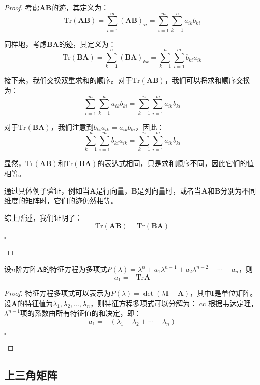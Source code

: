 \begin{proof}
	考虑$\mathbf{A}\mathbf{B}$的迹，其定义为：
$$
\text{Tr}(\mathbf{A}\mathbf{B}) = \sum_{i=1}^m (\mathbf{A}\mathbf{B})_{ii} = \sum_{i=1}^m \sum_{k=1}^n a_{ik} b_{ki}
$$

同样地，考虑$\mathbf{B}\mathbf{A}$的迹，其定义为：
$$
\text{Tr}(\mathbf{B}\mathbf{A}) = \sum_{k=1}^n (\mathbf{B}\mathbf{A})_{kk} = \sum_{k=1}^n \sum_{i=1}^m b_{ki} a_{ik}
$$

接下来，我们交换双重求和的顺序。对于$\text{Tr}(\mathbf{A}\mathbf{B})$，我们可以将求和顺序交换为：
$$
\sum_{i=1}^m \sum_{k=1}^n a_{ik} b_{ki} = \sum_{k=1}^n \sum_{i=1}^m a_{ik} b_{ki}
$$

对于$\text{Tr}(\mathbf{B}\mathbf{A})$，我们注意到$b_{ki} a_{ik} = a_{ik} b_{ki}$，因此：
$$
\sum_{k=1}^n \sum_{i=1}^m b_{ki} a_{ik} = \sum_{k=1}^n \sum_{i=1}^m a_{ik} b_{ki}
$$

显然，$\text{Tr}(\mathbf{A}\mathbf{B})$和$\text{Tr}(\mathbf{B}\mathbf{A})$的表达式相同，只是求和顺序不同，因此它们的值相等。

通过具体例子验证，例如当$\mathbf{A}$是行向量，$\mathbf{B}$是列向量时，或者当$\mathbf{A}$和$\mathbf{B}$分别为不同维度的矩阵时，它们的迹仍然相等。

综上所述，我们证明了：
$$
\text{Tr}(\mathbf{A}\mathbf{B}) = \text{Tr}(\mathbf{B}\mathbf{A})
$$
\begin{flushright}
		$\square$
	\end{flushright}
\end{proof}

\begin{corollary}
	\label{cor:trace}
	设$n$阶方阵$\mathbf{A}$的特征方程为多项式$P(\lambda)=\lambda^n+a_1\lambda^{n-1}+a_2\lambda^{n-2}+\cdots+a_n$，则$$a_1=-\text{Tr}\mathbf{A}$$
\end{corollary}

\begin{proof}
	特征方程多项式可以表示为$P(\lambda) = \det(\lambda \mathbf{I} - \mathbf{A})$，其中$\mathbf{I}$是单位矩阵。设$\mathbf{A}$的特征值为$\lambda_1, \lambda_2, \ldots, \lambda_n$，则特征方程多项式可以分解为：
   cc
   根据韦达定理，$\lambda^{n-1}$项的系数由所有特征值的和决定，即：
   $$
   a_1 = -(\lambda_1 + \lambda_2 + \cdots + \lambda_n)
   $$
   \begin{flushright}
		$\square$
	\end{flushright}
\end{proof}

\subsection{上三角矩阵}

